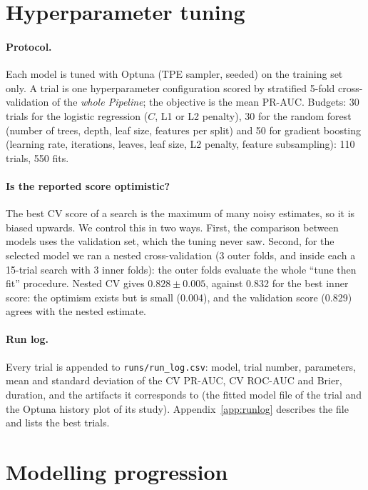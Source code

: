 \documentclass[11pt,a4paper]{article}
\newcommand{\code}[1]{\texttt{#1}}
\begin{document}
\section{Hyperparameter tuning}

\paragraph{Protocol.} Each model is tuned with Optuna (TPE sampler, seeded) on the training set
only. A trial is one hyperparameter configuration scored by stratified 5-fold cross-validation of
the \emph{whole Pipeline}; the objective is the mean PR-AUC. Budgets: 30 trials for the logistic
regression ($C$, L1 or L2 penalty), 30 for the random forest (number of trees, depth, leaf size,
features per split) and 50 for gradient boosting (learning rate, iterations, leaves, leaf size, L2
penalty, feature subsampling): 110 trials, 550 fits.

\paragraph{Is the reported score optimistic?} The best CV score of a search is the maximum of many
noisy estimates, so it is biased upwards. We control this in two ways. First, the comparison between
models uses the validation set, which the tuning never saw. Second, for the selected model we ran a
nested cross-validation (3 outer folds, and inside each a 15-trial search with 3 inner folds): the
outer folds evaluate the whole ``tune then fit'' procedure. Nested CV gives $0.828 \pm 0.005$,
against 0.832 for the best inner score: the optimism exists but is small (0.004), and the validation
score (0.829) agrees with the nested estimate.

\paragraph{Run log.} Every trial is appended to \code{runs/run\_log.csv}: model, trial number,
parameters, mean and standard deviation of the CV PR-AUC, CV ROC-AUC and Brier, duration, and the
artifacts it corresponds to (the fitted model file of the trial and the Optuna history plot of
its study). Appendix~\ref{app:runlog} describes the file and lists the best trials.

\section{Modelling progression}\label{sec:models}
\end{document}
